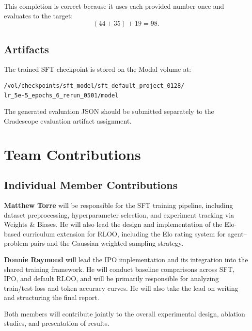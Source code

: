 \documentclass[11pt]{article}
\begin{document}
This completion is correct because it uses each provided number once and evaluates to the target:
\[
(44 + 35) + 19 = 98.
\]

\subsection{Artifacts}

The trained SFT checkpoint is stored on the Modal volume at:

\begin{verbatim}
/vol/checkpoints/sft_model/sft_default_project_0128/
lr_5e-5_epochs_6_rerun_0501/model
\end{verbatim}

The generated evaluation JSON should be submitted separately to the Gradescope evaluation artifact assignment.

\section{Team Contributions}

\subsection{Individual Member Contributions}

\textbf{Matthew Torre} will be responsible for the SFT training pipeline, including dataset preprocessing, hyperparameter selection, and experiment tracking via Weights \& Biases. He will also lead the design and implementation of the Elo-based curriculum extension for RLOO, including the Elo rating system for agent--problem pairs and the Gaussian-weighted sampling strategy.

\textbf{Donnie Raymond} will lead the IPO implementation and its integration into the shared training framework. He will conduct baseline comparisons across SFT, IPO, and default RLOO, and will be primarily responsible for analyzing train/test loss and token accuracy curves. He will also take the lead on writing and structuring the final report.

Both members will contribute jointly to the overall experimental design, ablation studies, and presentation of results.
\end{document}
